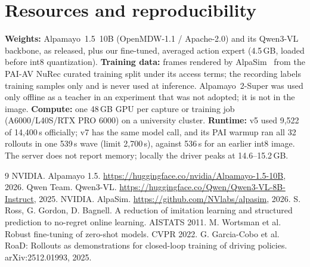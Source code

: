 \documentclass{article}
\begin{document}
\section{Resources and reproducibility}
\textbf{Weights:} Alpamayo~1.5~10B (OpenMDW-1.1 / Apache-2.0) and its Qwen3-VL backbone, as released, plus our
fine-tuned, averaged action expert (4.5\,GB, loaded before int8 quantization). \textbf{Training data:} frames rendered
by AlpaSim~\cite{alpasim} from the PAI-AV NuRec curated training split under its access terms; the recording labels
training samples only and is never used at inference. Alpamayo~2-Super was used only offline as a teacher in an
experiment that was not adopted; it is not in the image. \textbf{Compute:} one 48\,GB GPU per capture or training job
(A6000/L40S/RTX PRO 6000) on a university cluster. \textbf{Runtime:} v5 used 9{,}522 of 14{,}400\,s officially; v7
has the same model call, and its PAI warmup ran all 32 rollouts in one 539\,s wave (limit 2{,}700\,s), against
536\,s for an earlier int8 image. The server does not report memory; locally the driver peaks at 14.6--15.2\,GB.

\begin{thebibliography}{9}
 NVIDIA. \newblock Alpamayo 1.5. \newblock \url{https://huggingface.co/nvidia/Alpamayo-1.5-10B}, 2026.
 Qwen Team. \newblock Qwen3-VL. \newblock \url{https://huggingface.co/Qwen/Qwen3-VL-8B-Instruct}, 2025.
 NVIDIA. \newblock AlpaSim. \newblock \url{https://github.com/NVlabs/alpasim}, 2026.
 S. Ross, G. Gordon, D. Bagnell. \newblock A reduction of imitation learning and structured prediction
to no-regret online learning. \newblock AISTATS 2011.
 M. Wortsman et al. \newblock Robust fine-tuning of zero-shot models. \newblock CVPR 2022.
 G. Garcia-Cobo et al. \newblock RoaD: Rollouts as demonstrations for closed-loop training of driving
policies. \newblock arXiv:2512.01993, 2025.
\end{thebibliography}
\end{document}
